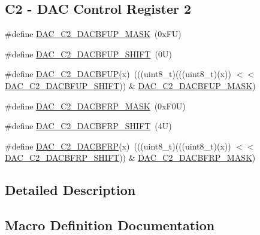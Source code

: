 \subsection*{C2 -\/ D\+AC Control Register 2}
\begin{DoxyCompactItemize}
\item 
\#define \mbox{\hyperlink{group___d_a_c___register___masks_ga329015367026aaee34f54edcbaab61bb}{D\+A\+C\+\_\+\+C2\+\_\+\+D\+A\+C\+B\+F\+U\+P\+\_\+\+M\+A\+SK}}~(0x\+F\+U)
\item 
\#define \mbox{\hyperlink{group___d_a_c___register___masks_ga5d43a79719748e490a572fa6cdc75efe}{D\+A\+C\+\_\+\+C2\+\_\+\+D\+A\+C\+B\+F\+U\+P\+\_\+\+S\+H\+I\+FT}}~(0\+U)
\item 
\#define \mbox{\hyperlink{group___d_a_c___register___masks_ga8047d00b752e60690bae95e47bd8d75e}{D\+A\+C\+\_\+\+C2\+\_\+\+D\+A\+C\+B\+F\+UP}}(x)~(((uint8\+\_\+t)(((uint8\+\_\+t)(x)) $<$$<$ \mbox{\hyperlink{group___d_a_c___register___masks_ga5d43a79719748e490a572fa6cdc75efe}{D\+A\+C\+\_\+\+C2\+\_\+\+D\+A\+C\+B\+F\+U\+P\+\_\+\+S\+H\+I\+FT}})) \& \mbox{\hyperlink{group___d_a_c___register___masks_ga329015367026aaee34f54edcbaab61bb}{D\+A\+C\+\_\+\+C2\+\_\+\+D\+A\+C\+B\+F\+U\+P\+\_\+\+M\+A\+SK}})
\item 
\#define \mbox{\hyperlink{group___d_a_c___register___masks_ga64b53e5effabf2e736fca6088752e6ea}{D\+A\+C\+\_\+\+C2\+\_\+\+D\+A\+C\+B\+F\+R\+P\+\_\+\+M\+A\+SK}}~(0x\+F0\+U)
\item 
\#define \mbox{\hyperlink{group___d_a_c___register___masks_ga0ab880f693c25ecf491d3b76df611456}{D\+A\+C\+\_\+\+C2\+\_\+\+D\+A\+C\+B\+F\+R\+P\+\_\+\+S\+H\+I\+FT}}~(4\+U)
\item 
\#define \mbox{\hyperlink{group___d_a_c___register___masks_ga63520cda0dd201e556b139f064b82ee3}{D\+A\+C\+\_\+\+C2\+\_\+\+D\+A\+C\+B\+F\+RP}}(x)~(((uint8\+\_\+t)(((uint8\+\_\+t)(x)) $<$$<$ \mbox{\hyperlink{group___d_a_c___register___masks_ga0ab880f693c25ecf491d3b76df611456}{D\+A\+C\+\_\+\+C2\+\_\+\+D\+A\+C\+B\+F\+R\+P\+\_\+\+S\+H\+I\+FT}})) \& \mbox{\hyperlink{group___d_a_c___register___masks_ga64b53e5effabf2e736fca6088752e6ea}{D\+A\+C\+\_\+\+C2\+\_\+\+D\+A\+C\+B\+F\+R\+P\+\_\+\+M\+A\+SK}})
\end{DoxyCompactItemize}


\subsection{Detailed Description}


\subsection{Macro Definition Documentation}
\mbox{\label{group___d_a_c___register___masks_gadfe0025fe66918c644e110c3b055c955}} 
